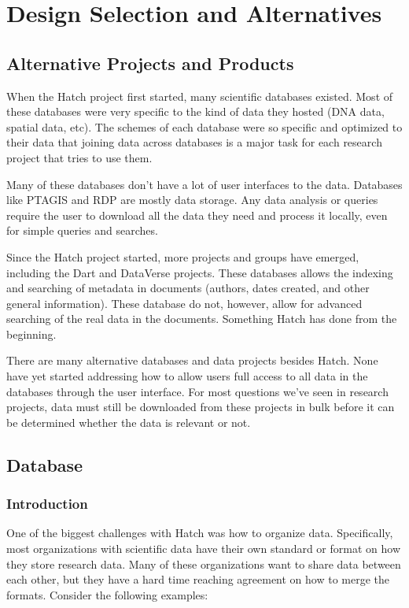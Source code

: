 \section{Design Selection and Alternatives}

\subsection{Alternative Projects and Products}

When the Hatch project first started, many scientific databases existed. Most of these
databases were very specific to the kind of data they hosted (DNA data, spatial data,
etc). The schemes of each database were so specific and optimized to their data that
joining data across databases is a major task for each research project that tries to
use them.

Many of these databases don't have a lot of user interfaces to the data. Databases like
PTAGIS and RDP are mostly data storage. Any data analysis or queries require the user
to download all the data they need and process it locally, even for simple queries and
searches.

Since the Hatch project started, more projects and groups have emerged, including the
Dart and DataVerse projects. These databases allows the indexing and searching of
metadata in documents (authors, dates created, and other general information).
These database do not, however, allow for advanced searching of the real data in 
the documents. Something Hatch has done from the beginning.

There are many alternative databases and data projects besides Hatch. None have yet
started addressing how to allow users full access to all data in the databases
through the user interface. For most questions we've seen in research projects,
data must still be downloaded from these projects in bulk before it can be determined
whether the data is relevant or not.

\subsection{Database}

\subsubsection{Introduction}
One of the biggest challenges with Hatch was how to organize data. Specifically,
most organizations with scientific data have their own standard or format on 
how they store research data. Many of these organizations want to share data between 
each other, but they have a hard time reaching agreement on how to merge the formats.
Consider the following examples:

